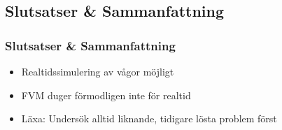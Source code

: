 \subsection{Slutsatser \& Sammanfattning}

\begin{frame}[<+(1)->]
\frametitle{Slutsatser \& Sammanfattning}

\begin{itemize}
\item Realtidssimulering av vågor möjligt
\item FVM duger förmodligen inte för realtid
\item Läxa: Undersök alltid liknande, tidigare lösta problem först
\end{itemize}

\end{frame}
